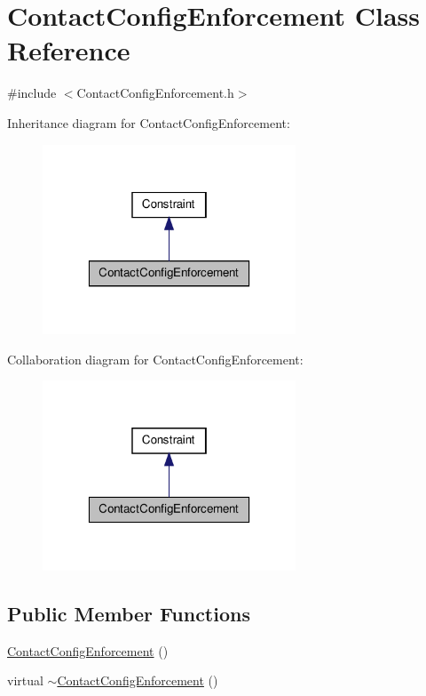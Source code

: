 \hypertarget{classContactConfigEnforcement}{\section{\-Contact\-Config\-Enforcement \-Class \-Reference}
\label{classContactConfigEnforcement}
}


{\ttfamily \#include $<$\-Contact\-Config\-Enforcement.\-h$>$}



\-Inheritance diagram for \-Contact\-Config\-Enforcement\-:
\nopagebreak
\begin{figure}[H]
\begin{center}
\leavevmode
\includegraphics[width=214pt]{classContactConfigEnforcement__inherit__graph}
\end{center}
\end{figure}


\-Collaboration diagram for \-Contact\-Config\-Enforcement\-:
\nopagebreak
\begin{figure}[H]
\begin{center}
\leavevmode
\includegraphics[width=214pt]{classContactConfigEnforcement__coll__graph}
\end{center}
\end{figure}
\subsection*{\-Public \-Member \-Functions}
\begin{DoxyCompactItemize}
\item 
\hyperlink{classContactConfigEnforcement_affa2663e090bfc8ba63b2a32a31f1707}{\-Contact\-Config\-Enforcement} ()
\item 
virtual \hyperlink{classContactConfigEnforcement_a8a58b4c421e538be35979680c96fd1d9}{$\sim$\-Contact\-Config\-Enforcement} ()
\end{DoxyCompactItemize}

